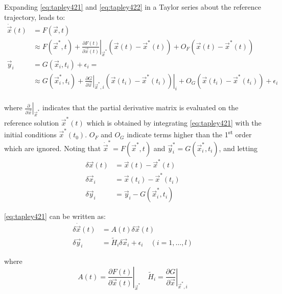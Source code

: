 Expanding \ref{eq:tapley421} and \ref{eq:tapley422} in a Taylor series about the 
reference trajectory, leads to:
\begin{equation}
\label{eq:tapley425}
\begin{aligned}
  \dot{\vec{x}} (t) &= F (\vec{x}, t) \\
   & \approx F (\vec{x}^* , t) 
    + \left.\frac{\partial F(t)}{\partial \vec{x}(t)}\right|_{\vec{x}^*} \left( \vec{x}(t) - \vec{x}^* (t) \right)
    + O_F \left( \vec{x}(t) - \vec{x}^* (t) \right) \\
    \vec{y}_i &= G( \vec{x}_i , t_i ) + {\epsilon}_i = \\ & \approx G( \vec{x}^*_i , t_i )
    + \left.\frac{\partial G}{\partial \vec{x}}\right|_{\vec{x}^* , i} \left.\left( \vec{x}(t_i) - \vec{x}^* (t_i) \right)\right|_{i} 
    + O_G \left( \vec{x}(t_i) - \vec{x}^* (t_i) \right) + {\epsilon}_i \\
\end{aligned}
\end{equation}

where \(\left.\frac{\partial}{\partial \vec{x}}\right|_{\vec{x}^*}\) indicates that 
the partial derivative matrix is evaluated on the reference solution \(\vec{x}^* (t)\) 
which is obtained by integrating \ref{eq:tapley421} with the initial conditions 
\(\vec{x}^* (t_0)\). \(O_F\) and \(O_G\) indicate terms higher than the 1\textsuperscript{st} 
order which are ignored. Noting that \(\dot{\vec{x}}^* = F(\vec{x}^* ,t)\) and 
\(\vec{y}^*_i = G(\vec{x}^*_i , t_i )\), and letting
\begin{subequations}
\begin{align}
\delta \vec{x}(t) & = \vec{x}(t) - \vec{x}^*(t) \label{eq:tapley426ua} \\
\delta \vec{x}_i  & = \vec{x}(t_i) - \vec{x}^*(t_i)\label{eq:tapley426ub}\\
\delta \vec{y}_i  & = \vec{y}_i - G(\vec{x}^*_i , t_i ) \label{eq:tapley426uc}
\end{align}
\end{subequations}

\ref{eq:tapley421} can be written as:
\begin{align}
  \label{eq:tapley426a}
  \delta \dot{\vec{x}}(t) &= A(t) \delta \vec{x}(t) \\
  \label{eq:tapley426b}
  \delta \vec{y}_i &= \tilde{H}_i \delta \vec{x}_i + {\epsilon}_i \quad (i=1,\ldots,l)
\end{align}

where
\begin{equation}
\label{eq:tapley426ah}
A(t) = \left.\frac{\partial F(t)}{\partial \vec{x} (t)}\right|_{\vec{x}^*} 
\quad
\tilde{H}_i = \left.\frac{\partial G}{\partial \vec{x}}\right|_{\vec{x}^* , i}
\end{equation}

